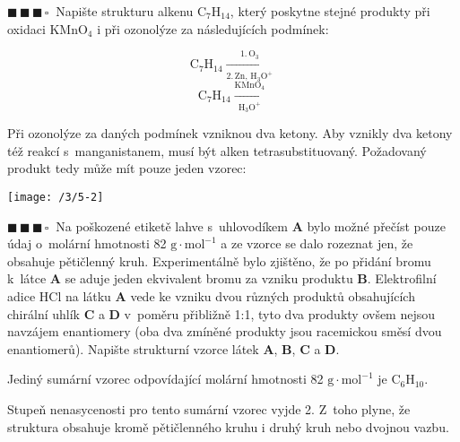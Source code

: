 \documentclass{book}
\newcommand{\tri}{$\blacksquare \, \blacksquare \, \blacksquare \, \square \; \; $}
\renewenvironment{quotation}{\par}{\par} %
\begin{document}
\hrulefill %
\begin{quotation}
\tri Napište strukturu alkenu C$_{7}$H$_{14}$, který poskytne stejné
produkty při oxidaci KMnO$_{4}$ i při ozonolýze za následujících
podmínek:

\[
\mathrm{C_{7}H_{14}\xrightarrow[2.\,Zn,\,H_{3}O^{+}]{1.\,O_{3}}}
\]
\[
\mathrm{C_{7}H_{14}\xrightarrow[H_{3}O^{+}]{KMnO_{4}}}
\]
\end{quotation} \dotfill \par 
Při ozonolýze za daných podmínek vzniknou dva ketony. Aby vznikly
dva ketony též reakcí s~manganistanem, musí být alken tetrasubstituovaný.
Požadovaný produkt tedy může mít pouze jeden vzorec:
\noindent \begin{center}

\texttt{[image: /3/5-2]}

\par\end{center}

\newpage %
\begin{quotation}
\tri Na poškozené etiketě lahve s~uhlovodíkem \textbf{A} bylo možné přečíst pouze
údaj o~molární hmotnosti 82 $\mathrm{g\cdot mol^{-1}}$ a ze vzorce se dalo rozeznat jen,
že obsahuje pětičlenný kruh. Experimentálně bylo zjištěno, že po přidání
bromu k~látce \textbf{A} se aduje jeden ekvivalent bromu za vzniku produktu \textbf{B}. Elektrofilní adice HCl na látku \textbf{A} vede ke vzniku dvou různých produktů
obsahujících chirální uhlík \textbf{C} a \textbf{D} v~poměru přibližně 1:1, tyto dva
produkty ovšem nejsou navzájem enantiomery (oba dva zmíněné produkty jsou racemickou směsí dvou enantiomerů). Napište strukturní vzorce
látek \textbf{A}, \textbf{B}, \textbf{C} a \textbf{D}.
\end{quotation} \dotfill \par 


Jediný sumární vzorec odpovídající molární hmotnosti 82 $\mathrm{g\cdot mol^{-1}}$ je $\mathrm{C_{6}H_{10}}$.

Stupeň nenasycenosti pro tento sumární vzorec vyjde 2. Z~toho plyne, že struktura obsahuje kromě
pětičlenného kruhu i druhý kruh nebo dvojnou vazbu. 
\end{document}
